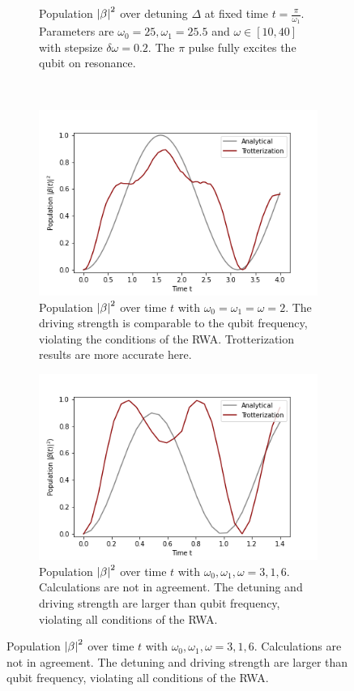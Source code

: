 \begin{figure}[h]
\begin{subfigure}[t]{0.48\textwidth}
        \caption{Population $\left|\beta\right|^2$ over detuning $\Delta$ at fixed time $t = \frac{\pi}{\omega_1}$. Parameters are $\omega_0 = 25, \omega_1 = 25.5$ and $\omega \in [10, 40]$ with stepsize $\delta\omega = 0.2$. The $\pi$ pulse fully excites the qubit on resonance.}
        \label{fig:exercise06_02}
    \end{subfigure}
    \\
    \begin{subfigure}[t]{0.48\textwidth}
        \includegraphics[width=\textwidth]{tex/figures/exercise06_03.png}
        \caption{Population $\left|\beta\right|^2$ over time $t$ with $\omega_0 = \omega_1 = \omega = 2$. The driving strength is comparable to the qubit frequency, violating the conditions of the RWA. Trotterization results are more accurate here.}
        \label{fig:exercise06_03}
    \end{subfigure}
    \begin{subfigure}[t]{0.48\textwidth}
        \includegraphics[width=\textwidth]{tex/figures/exercise06_04.png}
        \caption{Population $\left|\beta\right|^2$ over time $t$ with $\omega_0, \omega_1, \omega = 3, 1, 6$. Calculations are not in agreement. The detuning and driving strength are larger than qubit frequency, violating all conditions of the RWA.}
        \label{fig:exercise06_04}
    \end{subfigure}
\end{figure}
